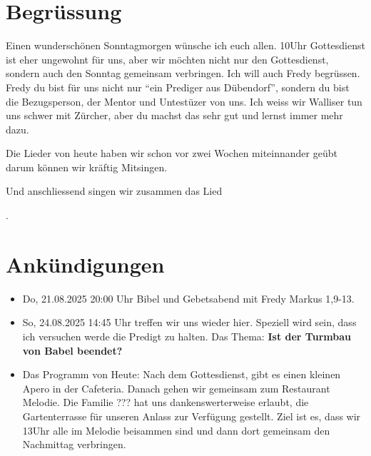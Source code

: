 \documentclass{../../inc/mybib}
\begin{document}
\section{Begrüssung}
Einen wunderschönen Sonntagmorgen wünsche ich euch allen. 10Uhr Gottesdienst ist eher ungewohnt für uns, aber wir möchten nicht nur den Gottesdienst, sondern auch den Sonntag gemeinsam verbringen. Ich will auch Fredy begrüssen. Fredy du bist für uns nicht nur \enquote{ein Prediger aus Dübendorf}, sondern du bist die Bezugsperson, der Mentor und Untestüzer von uns. Ich weiss wir Walliser tun uns schwer mit Zürcher, aber du machst das sehr gut und lernst immer mehr dazu.

Die Lieder von heute haben wir schon vor zwei Wochen miteinnander geübt darum können wir kräftig Mitsingen.

\beten{} Und anschliessend singen wir zusammen das Lied

{}.

\section{Ankündigungen}
\begin{itemize}
    \item {} Do, 21.08.2025 20:00 Uhr Bibel und Gebetsabend mit Fredy  Markus 1,9-13.
    \item {} So, 24.08.2025 14:45 Uhr treffen wir uns wieder hier. Speziell wird sein, dass ich versuchen werde die Predigt zu halten. Das Thema: \textbf{Ist der Turmbau von Babel beendet?}
    \item {} Das Programm von Heute: Nach dem Gottesdienst, gibt es einen kleinen Apero in der Cafeteria. Danach gehen wir gemeinsam zum Restaurant Melodie. Die Familie ??? hat uns dankenswerterweise erlaubt, die Gartenterrasse für unseren Anlass zur Verfügung gestellt.
    Ziel ist es, dass wir 13Uhr alle im Melodie beisammen sind und dann dort gemeinsam den Nachmittag verbringen.
\end{itemize}
\end{document}
